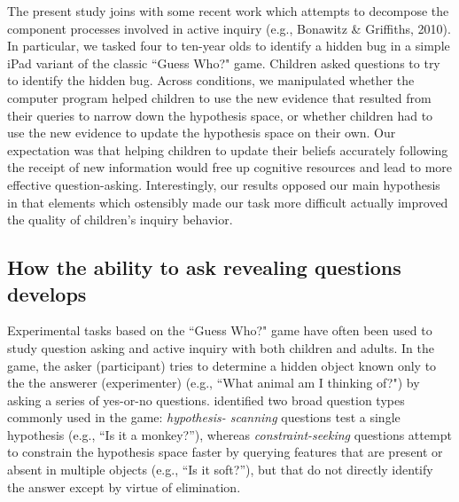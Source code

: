 \documentclass[man,floatsintext]{apa6}
\begin{document}
\nocite{Bonawitz:2010pb}
The present study joins with some recent work which attempts to decompose the 
component processes involved in active inquiry (e.g., Bonawitz \& Griffiths, 2010).  
In particular, we tasked four to ten-year olds to identify a hidden bug in
a simple iPad variant of the classic ``Guess Who?" game. Children asked questions to try 
to identify the hidden bug. Across conditions, we manipulated whether the computer program 
helped children to use the new evidence that resulted from their queries to narrow down the
hypothesis space, or whether children had to use the new evidence to update the hypothesis space
on their own.  Our expectation was that helping children to update their beliefs accurately following the 
receipt of new information would free up cognitive resources and lead to more effective question-asking. 
Interestingly, our results opposed our main hypothesis in that elements which 
ostensibly made our task more difficult actually improved the quality of children's inquiry 
behavior.  

\subsection{How the ability to ask revealing questions develops}

Experimental tasks based on the ``Guess Who?" game have often been used to
study question asking and active inquiry with both children and adults.
In the game, the asker (participant) tries to determine a hidden object known
only to the the answerer (experimenter) (e.g., ``What animal am I thinking of?")
by asking a series of yes-or-no questions.
 identified two broad question types commonly used in the game: \emph{hypothesis-
scanning} questions test a single hypothesis (e.g., ``Is it a monkey?''), whereas 
\emph{constraint-seeking} questions attempt to constrain the hypothesis space faster by 
querying features that are present or absent in multiple objects (e.g., ``Is it soft?''), 
but that do not directly identify the answer except by virtue of elimination. 
\end{document}
